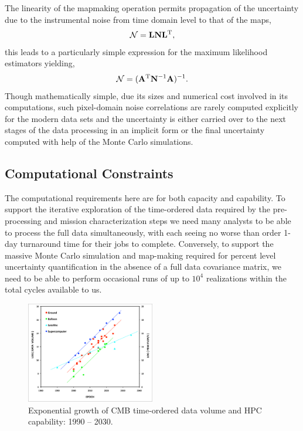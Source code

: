 The linearity of the mapmaking operation permits propagation of the uncertainty due to the instrumental noise from time domain level
to that of the maps,
\begin{eqnarray}
{\cal N} = \mathbf{L} \mathbf{N} \mathbf{L}^{\rm T},
\end{eqnarray}
this leads to a particularly simple expression for the maximum likelihood estimators yielding,
\begin{eqnarray}
{\cal N} = (\mathbf{A}^{\rm T} \mathbf{N}^{-1} \mathbf{A})^{-1}.
\end{eqnarray}
Though mathematically simple, due its sizes and numerical cost involved in its computations, such pixel-domain noise correlations
are rarely computed explicitly for the modern data sets and the uncertainty is either carried over to the next stages of the data processing 
in an implicit form or the final uncertainty computed with
help of the Monte Carlo simulations.

\subsection{Computational Constraints}



The computational requirements here are for both capacity and capability. To support the iterative exploration of the time-ordered data required by the pre-processing and mission characterization steps we need many analysts to be able to process the full data simultaneously, with each seeing no worse than order 1-day turnaround time for their jobs to complete. Conversely, to support the massive Monte Carlo simulation and map-making required for percent level uncertainty quantification in the absence of a full data covariance matrix, we need to be able to perform occasional runs of up to $10^4$ realizations within the total cycles available to us.

\begin{figure}[htbp]
\centering
\includegraphics[width=0.5\textwidth]{Analysis/cmb_hpc_scaling}
\caption{Exponential growth of CMB time-ordered data volume and HPC capability: 1990 -- 2030.}
\label{fig_cmb_hpc_scaling}
\end{figure}

